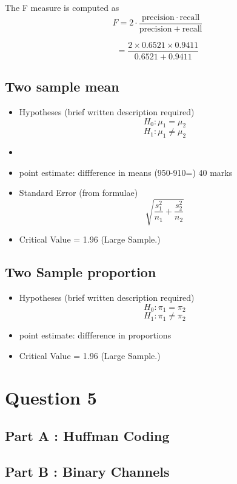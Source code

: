 \documentclass[]{article}
\begin{document}
The F measure is computed as
\[F = 2 \cdot \frac{\mathrm{precision} \cdot \mathrm{recall}}{ \mathrm{precision} + \mathrm{recall}}\]

\[ = \frac{2 \times 0.6521 \times 0.9411}{0.6521 + 0.9411}\]

\subsection*{Two sample mean}
\begin{itemize}
\item Hypotheses (brief written description required)
\[ H_0 :  \mu_1 = \mu_2\]
\[ H_1 :  \mu_1 \neq \mu_2\]
\item 
\item point estimate:  diffference in means (950-910=) 40 marks
\item Standard Error (from formulae)
\[\sqrt{\frac{s^2_1}{n_1} + \frac{s^2_2}{n_2} }\]
\item Critical Value = 1.96 (Large Sample.)
\end{itemize}

\subsection*{Two Sample proportion}
\begin{itemize}
\item Hypotheses (brief written description required)
\[ H_0 :  \pi_1 = \pi_2\]
\[ H_1 :  \pi_1 \neq \pi_2\]
\item point estimate:  diffference in proportions
\item Critical Value = 1.96 (Large Sample.)
\end{itemize}
\newpage
\section*{Question 5}
\subsection*{Part A : Huffman Coding}

\subsection*{Part B : Binary Channels}
\end{document}

